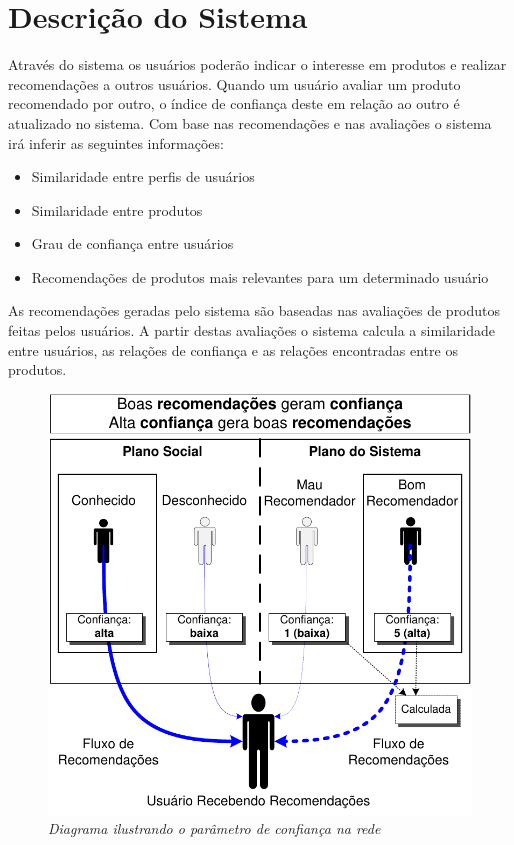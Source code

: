 
\section{Descrição do Sistema}
\label{sec:descricao_sistema}

 Através do sistema os usuários poderão indicar o interesse em produtos e realizar recomendações a outros usuários. Quando um usuário avaliar um produto recomendado por outro, o índice de confiança deste em relação ao outro é atualizado no sistema. Com base nas recomendações e nas avaliações o sistema irá inferir as seguintes informações:
 
\begin{itemize}

 \item Similaridade entre perfis de usuários

 \item Similaridade entre produtos

 \item Grau de confiança entre usuários

 \item Recomendações de produtos mais relevantes para um determinado usuário

\end{itemize}

 As recomendações geradas pelo sistema são baseadas nas avaliações de produtos feitas pelos usuários. A partir destas avaliações o sistema calcula a similaridade entre usuários, as relações de confiança e as relações encontradas entre os produtos.

\begin{figure}[htp]
 \centering
 \includegraphics[width=\textwidth]{imagens/diagrama_confianca}
 \caption{\it Diagrama ilustrando o parâmetro de confiança na rede}
 \label{fig:diagrama_confianca}
\end{figure}
 

